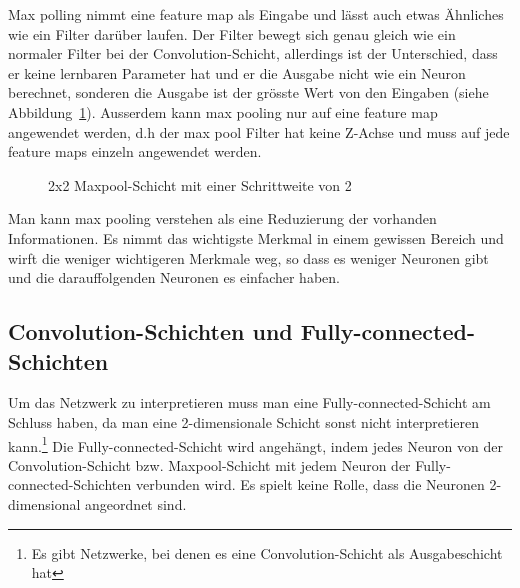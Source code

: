 \documentclass[12pt,a4paper]{report}
\begin{document}
Max polling nimmt eine feature map als Eingabe und lässt auch etwas Ähnliches wie ein Filter darüber laufen.
Der Filter bewegt sich genau gleich wie ein normaler Filter bei der Convolution-Schicht, allerdings ist der Unterschied, dass er keine lernbaren Parameter hat und
er die Ausgabe nicht wie ein Neuron berechnet, sonderen die Ausgabe ist der grösste Wert von den Eingaben (siehe Abbildung~\ref{fig:pool1}).
Ausserdem kann max pooling nur auf eine feature map angewendet werden,
d.h der max pool Filter hat keine Z-Achse und muss auf jede feature maps einzeln angewendet werden\cite{conv}.
\begin{figure}[h]
    \centering
    \caption{2x2 Maxpool-Schicht mit einer Schrittweite von 2}
    \label{fig:pool1}
\end{figure}
Man kann max pooling verstehen als eine Reduzierung der vorhanden Informationen.
Es nimmt das wichtigste Merkmal in einem gewissen Bereich und wirft die weniger wichtigeren Merkmale weg,
so dass es weniger Neuronen gibt und die darauffolgenden Neuronen es einfacher haben.

\subsection{Convolution-Schichten und Fully-connected-Schichten}
Um das Netzwerk zu interpretieren muss man eine Fully-connected-Schicht am Schluss haben,
da man eine 2-dimensionale Schicht sonst nicht interpretieren kann.\footnote{Es gibt Netzwerke, bei denen es eine Convolution-Schicht als Ausgabeschicht hat\cite{fullconvolution}}
Die Fully-connected-Schicht wird angehängt, indem jedes Neuron von der Convolution-Schicht bzw. Maxpool-Schicht mit jedem Neuron der Fully-connected-Schichten verbunden wird.
Es spielt keine Rolle, dass die Neuronen 2-dimensional angeordnet sind.
\end{document}
